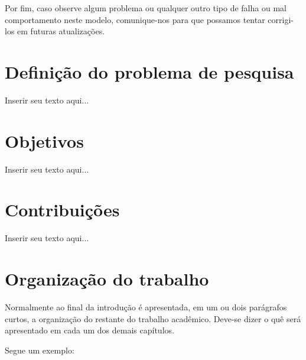 Por fim, caso observe algum problema ou qualquer outro tipo de falha ou mal comportamento neste modelo, comunique-nos para que possamos tentar corrigi-los em futuras atualizações.

\section{Definição do problema de pesquisa}
\label{sec_definicao_problema_pesquisa}

Inserir seu texto aqui...

\section{Objetivos}
\label{sec_objetivos}

Inserir seu texto aqui...

\section{Contribuições}
\label{sec_contribuicoes}

Inserir seu texto aqui...

\section{Organização do trabalho}
\label{sec_organizacao_trabalho}

Normalmente ao final da introdução é apresentada, em um ou dois parágrafos curtos, a organização do restante do trabalho acadêmico.
Deve-se dizer o quê será apresentado em cada um dos demais capítulos.

Segue um exemplo:

